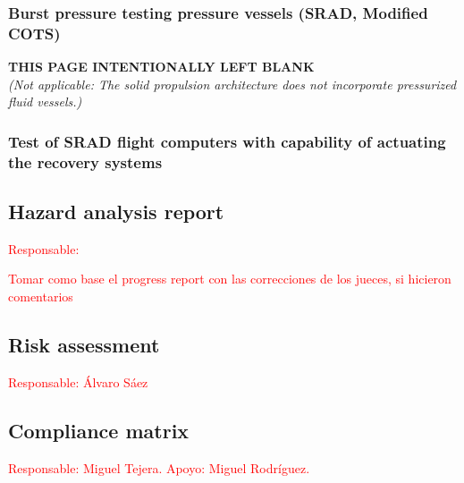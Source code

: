 \documentclass[11pt, a4paper]{article} %
\begin{document}
\subsubsection{Burst pressure testing pressure vessels (SRAD, Modified COTS)}
\vspace*{\fill}
\begin{center}
    \textbf{THIS PAGE INTENTIONALLY LEFT BLANK} \\
    \vspace{0.5cm}
    \textit{(Not applicable: The solid propulsion architecture does not incorporate pressurized fluid vessels.)}
\end{center}
\vspace*{\fill}
\newpage

\subsubsection{Test of SRAD flight computers with capability of actuating the recovery systems}

\subsection{Hazard analysis report} \textcolor{red}{Responsable: }

\vspace{1cm}

\textcolor{red}{Tomar como base el progress report con las correcciones de los jueces, si hicieron comentarios}

\subsection{Risk assessment} \textcolor{red}{Responsable: Álvaro Sáez}

\subsection{Compliance matrix} \textcolor{red}{Responsable: Miguel Tejera. Apoyo: Miguel Rodríguez.}
\end{document}
